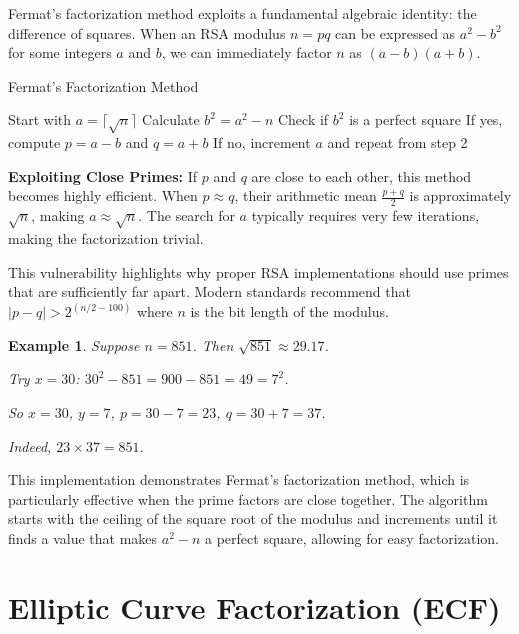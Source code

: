\documentclass{article}
\newtheorem{example}{Example}
\begin{document}
Fermat's factorization method exploits a fundamental algebraic identity: the difference of squares. When an RSA modulus $n = pq$ can be expressed as $a^2 - b^2$ for some integers $a$ and $b$, we can immediately factor $n$ as $(a-b)(a+b)$.
\newline

\begin{algorithm}
    \caption{Fermat's Factorization Method}
    \begin{algorithmic}[1]
        \State Start with $a = \lceil\sqrt{n}\rceil$
        \State Calculate $b^2 = a^2 - n$
        \State Check if $b^2$ is a perfect square
        \State If yes, compute $p = a - b$ and $q = a + b$
        \State If no, increment $a$ and repeat from step 2
    \end{algorithmic}
\end{algorithm}

\textbf{Exploiting Close Primes:} If $p$ and $q$ are close to each other, this method becomes highly efficient. When $p \approx q$, their arithmetic mean $\frac{p+q}{2}$ is approximately $\sqrt{n}$, making $a \approx \sqrt{n}$. The search for $a$ typically requires very few iterations, making the factorization trivial.

This vulnerability highlights why proper RSA implementations should use primes that are sufficiently far apart. Modern standards recommend that $|p-q| > 2^{(n/2-100)}$ where $n$ is the bit length of the modulus.

\begin{example}
    Suppose $n = 851$. Then $\sqrt{851} \approx 29.17$.

    Try $x = 30$: $30^2 - 851 = 900 - 851 = 49 = 7^2$.

    So $x = 30$, $y = 7$, $p = 30 - 7 = 23$, $q = 30 + 7 = 37$.

    Indeed, $23 \times 37 = 851$.
\end{example}



This implementation demonstrates Fermat's factorization method, which is particularly effective when the prime factors are close together. The algorithm starts with the ceiling of the square root of the modulus and increments until it finds a value that makes $a^2 - n$ a perfect square, allowing for easy factorization.

\section{Elliptic Curve Factorization (ECF)}
\end{document}
